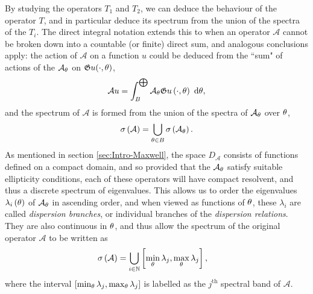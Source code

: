 By studying the operators $T_1$ and $T_2$, we can deduce the behaviour of the operator $T$, and in particular deduce its spectrum from the union of the spectra of the $T_i$.
The direct integral notation extends this to when an operator $\mathcal{A}$ cannot be broken down into a countable (or finite) direct sum, and analogous conclusions apply: the action of $\mathcal{A}$ on a function $u$ could be deduced from the ``sum" of actions of the $\mathcal{A}_{\theta}$ on $\mathfrak{G} u(\cdot,\theta)$,
\begin{align} \label{eq:GelfandDirectIntegral}
	\mathcal{A}u = \int_{B}^{\bigoplus}\mathcal{A}_{\theta}\mathfrak{G} u\left( \cdot,\theta \right) \ \mathrm{d}\theta,
\end{align}
and the spectrum of $\mathcal{A}$ is formed from the union of the spectra of $\mathcal{A}_{\theta}$ over $\theta$, 
\begin{align*}
	\sigma\left( \mathcal{A} \right) = \bigcup_{\theta\in B}\sigma\left( \mathcal{A}_{\theta} \right).
\end{align*}
As mentioned in section \ref{sec:Intro-Maxwell}, the space $D_{\mathcal{A}}$ consists of functions defined on a compact domain, and so provided that the $\mathcal{A}_{\theta}$ satisfy suitable ellipticity conditions, each of these operators will have compact resolvent, and thus a discrete spectrum of eigenvalues.
This allows us to order the eigenvalues $\lambda_i\left( \theta \right)$ of $\mathcal{A}_{\theta}$ in ascending order, and when viewed as functions of $\theta$, these $\lambda_i$ are called \emph{dispersion branches}, or individual branches of the \emph{dispersion relations}.
They are also continuous in $\theta$, and thus allow the spectrum of the original operator $\mathcal{A}$ to be written as
\begin{align*}
	\sigma\left( \mathcal{A} \right) &= \bigcup_{i\in\mathbb{N}}\left[  \min_{\theta}\lambda_j, \max_{\theta}\lambda_j  \right],
\end{align*}
where the interval $\left[  \min_{\theta}\lambda_j, \max_{\theta}\lambda_j  \right]$ is labelled as the $j^{\text{th}}$ spectral band of $\mathcal{A}$.

